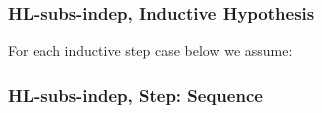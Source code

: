\subsubsection{\textsf{HL-subs-indep}, Inductive Hypothesis}

For each inductive step case below we assume:

\subsubsection{\textsf{HL-subs-indep}, Step: Sequence}

